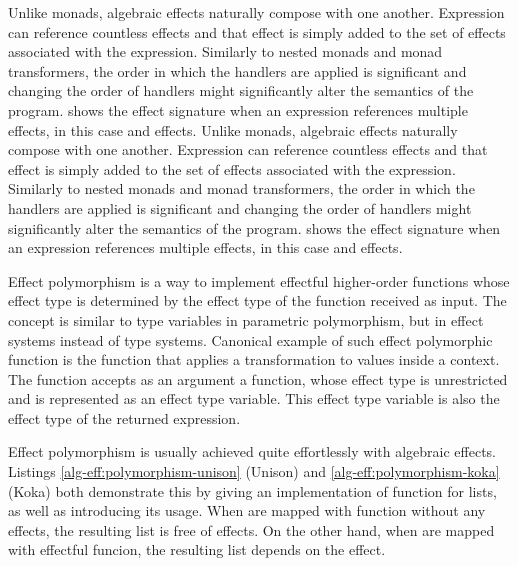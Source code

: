 Unlike monads, algebraic effects naturally compose with one another. Expression can reference countless effects and that effect is simply added to the set of effects associated with the expression. Similarly to nested monads and monad transformers, the order in which the handlers are applied is significant and changing the order of handlers might significantly alter the semantics of the program.  shows the effect signature when an expression references multiple effects, in this case  and  effects.
Unlike monads, algebraic effects naturally compose with one another. Expression can reference countless effects and that effect is simply added to the set of effects associated with the expression. Similarly to nested monads and monad transformers, the order in which the handlers are applied is significant and changing the order of handlers might significantly alter the semantics of the program.  shows the effect signature when an expression references multiple effects, in this case  and  effects.



Effect polymorphism is a way to implement effectful higher-order functions whose effect type is determined by the effect type of the function received as input. The concept is similar to type variables in parametric polymorphism, but in effect systems instead of type systems. Canonical example of such effect polymorphic function is the  function that applies a transformation to values inside a context. The  function accepts as an argument a function, whose effect type is unrestricted and is represented as an effect type variable. This effect type variable is also the effect type of the returned expression.



Effect polymorphism is usually achieved quite effortlessly with algebraic effects. Listings \ref{alg-eff:polymorphism-unison} (Unison) and \ref{alg-eff:polymorphism-koka} (Koka) both demonstrate this by giving an implementation of  function for lists, as well as introducing its usage. When  are mapped with function without any effects, the resulting list  is free of effects. On the other hand, when  are mapped with effectful funcion, the resulting list  depends on the  effect. 

